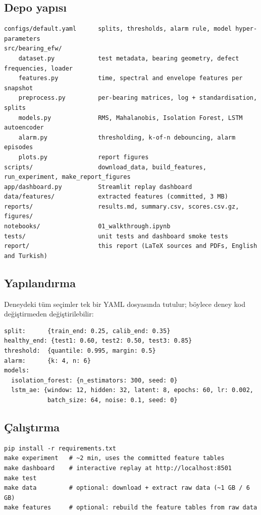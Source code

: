 \documentclass[11pt]{article}
\begin{document}
\subsection{Depo yapısı}
\begin{lstlisting}[style=plain]
configs/default.yaml      splits, thresholds, alarm rule, model hyper-parameters
src/bearing_efw/
    dataset.py            test metadata, bearing geometry, defect frequencies, loader
    features.py           time, spectral and envelope features per snapshot
    preprocess.py         per-bearing matrices, log + standardisation, splits
    models.py             RMS, Mahalanobis, Isolation Forest, LSTM autoencoder
    alarm.py              thresholding, k-of-n debouncing, alarm episodes
    plots.py              report figures
scripts/                  download_data, build_features, run_experiment, make_report_figures
app/dashboard.py          Streamlit replay dashboard
data/features/            extracted features (committed, 3 MB)
reports/                  results.md, summary.csv, scores.csv.gz, figures/
notebooks/                01_walkthrough.ipynb
tests/                    unit tests and dashboard smoke tests
report/                   this report (LaTeX sources and PDFs, English and Turkish)
\end{lstlisting}

\subsection{Yapılandırma}
Deneydeki tüm seçimler tek bir YAML dosyasında tutulur; böylece deney kod değiştirmeden
değiştirilebilir:
\begin{lstlisting}[style=plain]
split:      {train_end: 0.25, calib_end: 0.35}
healthy_end: {test1: 0.60, test2: 0.50, test3: 0.85}
threshold:  {quantile: 0.995, margin: 0.5}
alarm:      {k: 4, n: 6}
models:
  isolation_forest: {n_estimators: 300, seed: 0}
  lstm_ae: {window: 12, hidden: 32, latent: 8, epochs: 60, lr: 0.002,
            batch_size: 64, noise: 0.1, seed: 0}
\end{lstlisting}

\subsection{Çalıştırma}
\begin{lstlisting}[style=plain]
pip install -r requirements.txt
make experiment   # ~2 min, uses the committed feature tables
make dashboard    # interactive replay at http://localhost:8501
make test
make data         # optional: download + extract raw data (~1 GB / 6 GB)
make features     # optional: rebuild the feature tables from raw data
\end{lstlisting}
\end{document}
